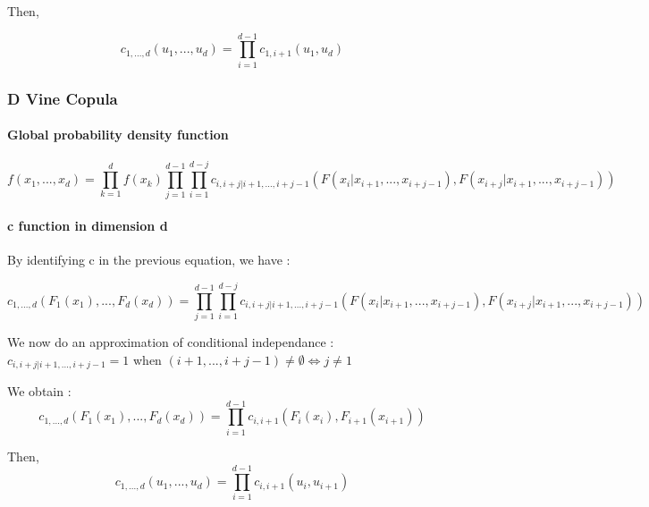 \documentclass{article}
\begin{document}
	Then,
	
	\begin{equation*}
		c_{1,...,d}(u_1,...,u_d) = \prod_{i=1}^{d-1} c_{1,i+1} (u_1,u_d)
	\end{equation*}	
	
	\subsubsection{D Vine Copula}

	\paragraph{Global probability density function}
	
	\begin{equation*}
		f(x_1,...,x_d)= \prod_{k=1}^d f(x_k) \prod_{j=1}^{d-1} \prod_{i=1}^{d-j} c_{i,i+j|i+1,...,i+j-1}(F(x_i|x_{i+1},...,x_{i+j-1}),F(x_{i+j}|x_{i+1},...,x_{i+j-1}))
	\end{equation*}
	
	\paragraph{c function in dimension d}
	By identifying c in the previous equation, we have :	
	
	\begin{equation*}
		c_{1,...,d}(F_1(x_1),...,F_d(x_d))= \prod_{j=1}^{d-1} \prod_{i=1}^{d-j} c_{i,i+j|i+1,...,i+j-1}(F(x_i|x_{i+1},...,x_{i+j-1}),F(x_{i+j}|x_{i+1},...,x_{i+j-1}))
	\end{equation*}
	
	We now do an approximation of conditional independance : \newline
	\begin{math} c_{i,i+j|i+1,...,i+j-1}=1 \end{math} when \begin{math} (i+1,...,i+j-1) \neq \emptyset \Leftrightarrow j\neq 1\end{math}
	
	We obtain :\newline
	\begin{equation*}
		c_{1,...,d}(F_1(x_1),...,F_d(x_d)) = \prod_{i=1}^{d-1} c_{i,i+1} (F_i(x_i),F_{i+1}(x_{i+1}))
	\end{equation*}

	Then,
	\begin{equation*}
		c_{1,...,d}(u_1,...,u_d) = \prod_{i=1}^{d-1} c_{i,i+1} (u_i,u_{i+1})
	\end{equation*}
	
\end{document}
